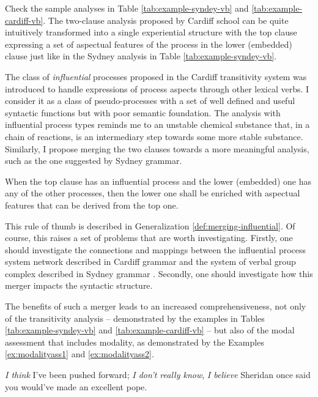 Check the sample analyses in Table \ref{tab:example-syndey-vb} and \ref{tab:example-cardiff-vb}. The two-clause analysis proposed by Cardiff school can be quite intuitively transformed into a single experiential structure with the top clause expressing a set of aspectual features of the process in the lower (embedded) clause just like in the Sydney analysis in Table \ref{tab:example-syndey-vb}. 

The class of \textit{influential} processes proposed in the Cardiff transitivity system was introduced to handle expressions of process aspects through other lexical verbs. I consider it as a class of pseudo-processes with a set of well defined and useful syntactic functions but with poor semantic foundation. The analysis with influential process types reminds me to an unstable chemical substance that, in a chain of reactions, is an intermediary step towards some more stable substance. Similarly, I propose merging the two clauses towards a more meaningful analysis, such as the one suggested by Sydney grammar. 

\begin{generalization} \label{def:merging-influential}
	When the top clause has an influential process and the lower (embedded) one has any of the other processes, then the lower one shall be enriched with aspectual features that can be derived from the top one.
\end{generalization}

This rule of thumb is described in Generalization \ref{def:merging-influential}. Of course, this raises a set of problems that are worth investigating. Firstly, one should investigate the connections and mappings between the influential process system network described in Cardiff grammar and the system of verbal group complex described in Sydney grammar \citep[p.589]{Halliday2013}. Secondly, one should investigate how this merger impacts the syntactic structure. 

The benefits of such a merger leads to an increased comprehensiveness, not only of the transitivity analysis -- demonstrated by the examples in Tables \ref{tab:example-syndey-vb} and \ref{tab:example-cardiff-vb} -- but also of the modal assessment that includes modality, as demonstrated by the Examples \ref{ex:modalityass1} and \ref{ex:modalityass2}. 

\begin{exe}
	\ex\label{ex:modalityass1} \textit{I think} I've been pushed forward; \textit{I don't really know}, \citep[p.183]{Halliday2013}
	\ex\label{ex:modalityass2} \textit{I believe} Sheridan once said you would've made an excellent pope. \citep[p.182]{Halliday2013}
\end{exe}

